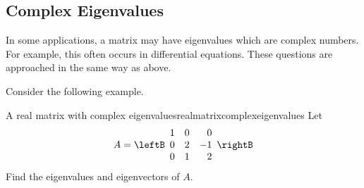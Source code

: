 \subsection{Complex Eigenvalues}

In some applications, a matrix may have eigenvalues
 which are complex numbers. For example, this often occurs in
differential equations. These questions are approached in the same way as above.

Consider the following example.

\begin{example}{A real matrix with complex eigenvalues}{realmatrixcomplexeigenvalues}
Let 
\begin{equation*}
A=\leftB
\begin{array}{rrr}
1 & 0 &  0 \\
0 & 2 & -1 \\
0 & 1 &  2
\end{array}
\rightB 
\end{equation*}
Find the eigenvalues and eigenvectors of $A$.
\end{example}

